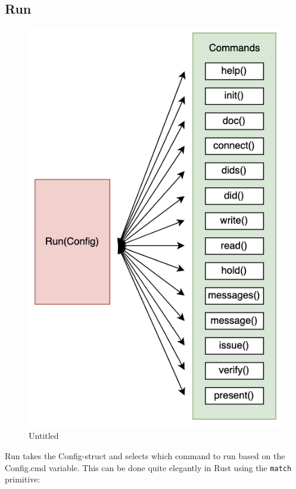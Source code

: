 \hypertarget{run}{%
\subsection{Run}\label{run}}

\begin{figure}
\centering
\includegraphics{Architecture 1442df162dbe45f4a423ba37d3e12363/Untitled 3.png}
\caption{Untitled}
\end{figure}

Run takes the Config-struct and selects which command to run based on
the Config.cmd variable. This can be done quite elegantly in Rust using
the \passthrough{\lstinline!match!} primitive:

